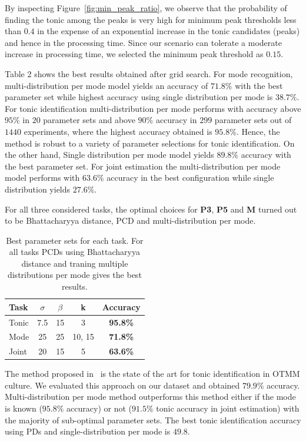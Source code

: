 \documentclass{sig-alternate}
\begin{document}
By inspecting Figure~\ref{fig:min_peak_ratio}, we observe that the probability of finding the tonic among the peaks is very high for minimum peak thresholds less than $0.4$ in the expense of an exponential increase in the tonic candidates (peaks) and hence in the processing time. Since our scenario can tolerate a moderate increase in processing time, we selected the minimum peak threshold as $0.15$.

Table 2 shows the best results obtained after grid search. For mode recognition, multi-distribution per mode model yields an accuracy of $71.8\%$ with the best parameter set while highest accuracy using single distribution per mode is $38.7\%$. For tonic identification multi-distribution per mode performs with accuracy above $95\%$ in $20$ parameter sets and above $90\%$ accuracy in $299$ parameter sets out of $1440$ experiments, where the highest accuracy obtained is $95.8\%$. Hence, the method is robust to a variety of parameter selections for tonic identification. On the other hand, Single distribution per mode model yields $89.8\%$ accuracy with the best parameter set. For joint estimation the multi-distribution per mode model performs with $63.6\%$ accuracy in the best configuration while single distribution yields $27.6\%$.

For all three considered tasks, the optimal choices for \textbf{P3}, \textbf{P5} and \textbf{M} turned out to be Bhattacharyya distance, PCD and multi-distribution per mode.
{\renewcommand{\arraystretch}{1.25}
\begin{table}[H]
\label{tab:best_results}
\caption{Best parameter sets for each task. For all tasks PCDs using Bhattacharyya distance and traning multiple distributions per mode gives the best results.}
 \begin{center}
\begin{tabular}{ l c c c c }
\hline
\textbf{Task} & \textbf{$\sigma$} & \textbf{$\beta$} & \textbf{k} & \textbf{Accuracy}\\ \hline
Tonic & 7.5 & 15 & 3 & \textbf{95.8\%}\\
 \hline
Mode & 25 & 25 & 10, 15 & \textbf{71.8\%} \\ \hline
Joint & 20 & 15 & 5 & \textbf{63.6\%}\\ \hline
\end{tabular}
\end{center}
\end{table}}

The method proposed in~\cite{sercan_tonic} is the state of the art for tonic identification in OTMM culture. We evaluated this approach on our dataset and obtained $79.9\%$ accuracy. Multi-distribution per mode method outperforms this method either if the mode is known ($95.8\%$ accuracy) or not ($91.5\%$ tonic accuracy in joint estimation) with the majority of sub-optimal parameter sets. The best tonic identification accuracy using PDs and single-distribution per mode is $49.8$. 
\end{document}
